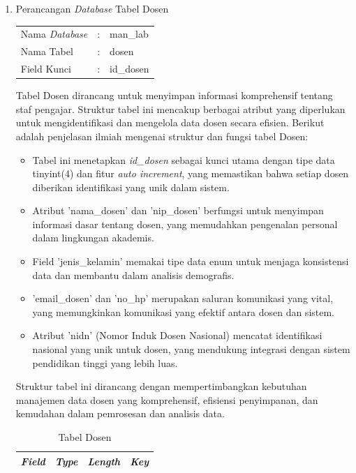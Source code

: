 \begin{enumerate}

	\item Perancangan \textit{Database} Tabel Dosen \\
	      \begin{tabular}{lll}
		      Nama \textit{Database} & : & man\_lab  \\
		      Nama Tabel             & : & dosen     \\
		      Field Kunci            & : & id\_dosen \\
	      \end{tabular}

	      Tabel Dosen dirancang untuk menyimpan informasi komprehensif tentang staf pengajar. Struktur tabel ini mencakup berbagai atribut yang diperlukan untuk mengidentifikasi dan mengelola data dosen secara efisien. Berikut adalah penjelasan ilmiah mengenai struktur dan fungsi tabel Dosen:

	      \begin{itemize}
		      \item Tabel ini menetapkan \textit{id\_dosen} sebagai kunci utama dengan tipe data tinyint(4) dan fitur \textit{auto increment}, yang memastikan bahwa setiap dosen diberikan identifikasi yang unik dalam sistem.
		      \item Atribut 'nama\_dosen' dan 'nip\_dosen' berfungsi untuk menyimpan informasi dasar tentang dosen, yang memudahkan pengenalan personal dalam lingkungan akademis.
		      \item Field 'jenis\_kelamin' memakai tipe data enum untuk menjaga konsistensi data dan membantu dalam analisis demografis.
		      \item 'email\_dosen' dan 'no\_hp' merupakan saluran komunikasi yang vital, yang memungkinkan komunikasi yang efektif antara dosen dan sistem.
		      \item Atribut 'nidn' (Nomor Induk Dosen Nasional) mencatat identifikasi nasional yang unik untuk dosen, yang mendukung integrasi dengan sistem pendidikan tinggi yang lebih luas.
	      \end{itemize}

	      Struktur tabel ini dirancang dengan mempertimbangkan kebutuhan manajemen data dosen yang komprehensif, efisiensi penyimpanan, dan kemudahan dalam pemrosesan dan analisis data.

		      {
			      \fontsize{10}{12}\selectfont
			      \begin{longtable}{l l l l}
				      \caption{Tabel Dosen}
				      \label{admin}                                                                                         \\
				      \hline
				      \textbf{\textit{Field}} & \textbf{\textit{Type}} & \textbf{\textit{Length}}   & \textbf{\textit{Key}} \\
				      \hline
				      \endfirsthead


\end{longtable}}
\end{enumerate}
